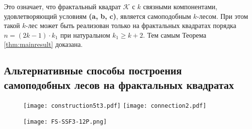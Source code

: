 Это означает, что фрактальный квадрат $\mathcal{K}$ с $k$ связными компонентами, удовлетворяющий условиям \textbf{(a, b, c)}, является самоподобным $k$-лесом.
При этом такой $k$-лес может быть реализован только на фрактальных квадратах порядка $n=(2k-1)\cdot k_1$ при натуральном $k_1\geq k+2$.
Тем самым Теорема \ref{thm:mainresult} доказана.


\subsection{Альтернативные способы построения самоподобных лесов на фрактальных квадратах}

\begin{figure}[H]
\texttt{[image: construction5t3.pdf]}
\hfill
\texttt{[image: connection2.pdf]}
\caption{}
\end{figure}


\begin{figure}[H]
\hfill
\texttt{[image: FS-SSF3-12P.png]}
\caption{}
\end{figure}

